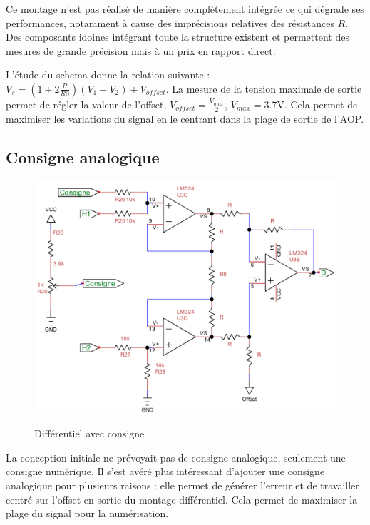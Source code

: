 \documentclass[11pt, french]{article} %
\begin{document}
Ce montage n'est pas réalisé de manière complètement intégrée ce qui dégrade ses performances, notamment à cause des imprécisions relatives des résistances $R$. Des composants idoines intégrant toute la structure existent et permettent des mesures de grande précision mais à un prix en rapport direct.

L'étude du schema donne la relation suivante : $V_s=(1+2 \frac{R}{R0})(V_1-V_2) + V_{offset}$. La mesure de la tension maximale de sortie permet de régler la valeur de l'offset, $V_{offset}=\frac{V_{max}}{2}$, $V_{max}=3.7$V. Cela permet de maximiser les variations du signal en le centrant dans la plage de sortie de l'AOP.

\subsection{Consigne analogique}
\begin{figure}
  \includegraphics[width=\linewidth]{SolutionAnalogique/AmpInstCons.pdf}
  \label{DiffConsigne}  
  \caption{Différentiel avec consigne}
\end{figure}
La conception initiale ne prévoyait pas de consigne analogique, seulement une consigne numérique. Il s'est avéré plus intéressant d'ajouter une consigne analogique pour plusieurs raisons : elle permet de générer l'erreur et de travailler centré sur l'offset en sortie du montage différentiel. Cela permet de maximiser la plage du signal pour la numérisation.
\end{document}
